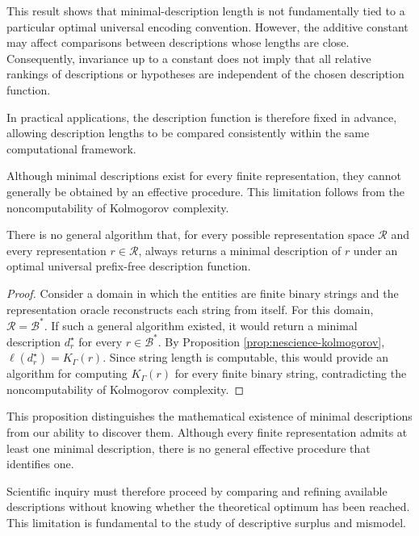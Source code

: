 This result shows that minimal-description length is not fundamentally tied to a particular optimal universal encoding convention. However, the additive constant may affect comparisons between descriptions whose lengths are close. Consequently, invariance up to a constant does not imply that all relative rankings of descriptions or hypotheses are independent of the chosen description function.

In practical applications, the description function is therefore fixed in advance, allowing description lengths to be compared consistently within the same computational framework.

Although minimal descriptions exist for every finite representation, they cannot generally be obtained by an effective procedure. This limitation follows from the noncomputability of Kolmogorov complexity.

\begin{proposition}
\label{prop:minimal_descriptions_uncomputable}
There is no general algorithm that, for every possible representation space $\mathcal{R}$ and every representation $r\in\mathcal{R}$, always returns a minimal description of $r$ under an optimal universal prefix-free description function.
\end{proposition}
\begin{proof}
Consider a domain in which the entities are finite binary strings and the representation oracle reconstructs each string from itself. For this domain, $\mathcal{R}=\mathcal{B}^\ast$. If such a general algorithm existed, it would return a minimal description $d_r^\star$ for every $r\in\mathcal{B}^\ast$. By Proposition \ref{prop:nescience-kolmogorov}, $\ell(d_r^\star)=K_\Gamma(r)$. Since string length is computable, this would provide an algorithm for computing $K_\Gamma(r)$ for every finite binary string,
contradicting the noncomputability of Kolmogorov complexity.
\end{proof}

This proposition distinguishes the mathematical existence of minimal descriptions from our ability to discover them. Although every finite representation admits at least one minimal description, there is no general effective procedure that identifies one.

Scientific inquiry must therefore proceed by comparing and refining available descriptions without knowing whether the theoretical optimum has been reached. This limitation is fundamental to the study of descriptive surplus and mismodel.

